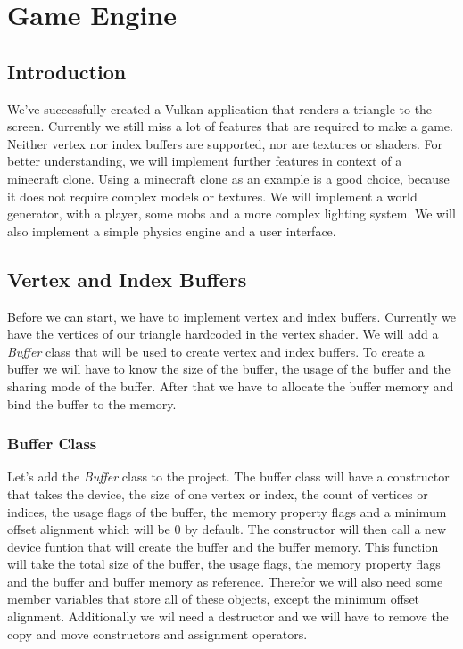 \documentclass[12pt]{report} \usepackage{preamble}
\begin{document}
\listoffigures

\chapter{Game Engine}

\section{Introduction}

We've successfully created a Vulkan application that renders a triangle to the screen. Currently we still miss a lot of features that are
required to make a game. Neither vertex nor index buffers are supported, nor are textures or shaders. For better understanding, we will implement
further features in context of a minecraft clone. Using a minecraft clone as an example is a good choice, because it does not require complex
models or textures. We will implement a world generator, with a player, some mobs and a more complex lighting system. We will also implement
a simple physics engine and a user interface.

\section{Vertex and Index Buffers}

Before we can start, we have to implement vertex and index buffers. Currently we have the vertices of our triangle hardcoded in the vertex shader.
We will add a \textit{Buffer} class that will be used to create vertex and index buffers. To create a buffer we will have to know the size of the buffer,
the usage of the buffer and the sharing mode of the buffer. After that we have to allocate the buffer memory and bind the buffer to the memory.

\subsection{Buffer Class}

Let's add the \textit{Buffer} class to the project. The buffer class will have a constructor that takes the device, the size of one vertex or index, the count of vertices or indices,
the usage flags of the buffer, the memory property flags and a minimum offset alignment which will be 0 by default. The constructor will then call a new device funtion that will create the buffer and the buffer memory.
This function will take the total size of the buffer, the usage flags, the memory property flags and the buffer and buffer memory as reference. Therefor we will also need some member variables
that store all of these objects, except the minimum offset alignment. Additionally we wil need a destructor and we will have to remove the copy and move constructors and assignment operators.
\end{document}
